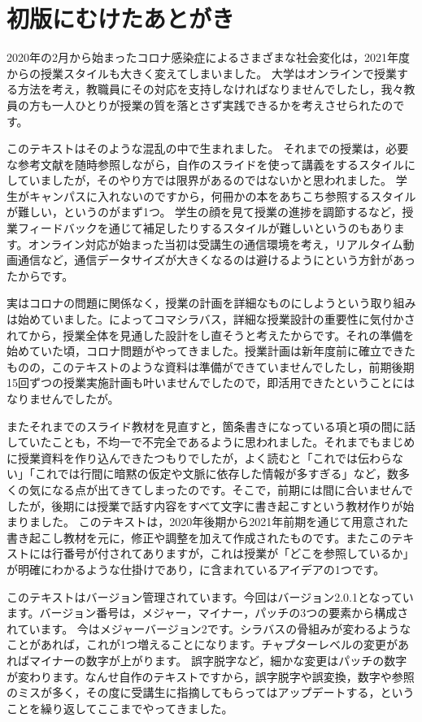 
\section*{初版にむけたあとがき}

2020年の2月から始まったコロナ感染症によるさまざまな社会変化は，2021年度からの授業スタイルも大きく変えてしまいました。
大学はオンラインで授業する方法を考え，教職員にその対応を支持しなければなりませんでしたし，我々教員の方も一人ひとりが授業の質を落とさず実践できるかを考えさせられたのです。

このテキストはそのような混乱の中で生まれました。
それまでの授業は，必要な参考文献を随時参照しながら，自作のスライドを使って講義をするスタイルにしていましたが，そのやり方では限界があるのではないかと思われました。
学生がキャンパスに入れないのですから，何冊かの本をあちこち参照するスタイルが難しい，というのがまず1つ。
学生の顔を見て授業の進捗を調節するなど，授業フィードバックを通じて補足したりするスタイルが難しいというのもあります。オンライン対応が始まった当初は受講生の通信環境を考え，リアルタイム動画通信など，通信データサイズが大きくなるのは避けるようにという方針があったからです。

実はコロナの問題に関係なく，授業の計画を詳細なものにしようという取り組みは始めていました。\textcite{Ashida2019}によってコマシラバス，詳細な授業設計の重要性に気付かされてから，授業全体を見通した設計をし直そうと考えたからです。それの準備を始めていた頃，コロナ問題がやってきました。授業計画は新年度前に確立できたものの，このテキストのような資料は準備ができていませんでしたし，前期後期15回ずつの授業実施計画も叶いませんでしたので，即活用できたということにはなりませんでしたが。

またそれまでのスライド教材を見直すと，箇条書きになっている項と項の間に話していたことも，不均一で不完全であるように思われました。それまでもまじめに授業資料を作り込んできたつもりでしたが，よく読むと「これでは伝わらない」「これでは行間に暗黙の仮定や文脈に依存した情報が多すぎる」など，数多くの気になる点が出てきてしまったのです。そこで，前期には間に合いませんでしたが，後期には授業で話す内容をすべて文字に書き起こすという教材作りが始まりました。
このテキストは，2020年後期から2021年前期を通じて用意された書き起こし教材を元に，修正や調整を加えて作成されたものです。またこのテキストには行番号が付されてありますが，これは授業が「どこを参照しているか」が明確にわかるような仕掛けであり，\textcite{Ashida2019}に含まれているアイデアの1つです。

このテキストはバージョン管理されています。今回はバージョン2.0.1となっています。バージョン番号は，メジャー，マイナー，パッチの3つの要素から構成されています。
今はメジャーバージョン2です。シラバスの骨組みが変わるようなことがあれば，これが1つ増えることになります。チャプターレベルの変更があればマイナーの数字が上がります。
誤字脱字など，細かな変更はパッチの数字が変わります。なんせ自作のテキストですから，誤字脱字や誤変換，数字や参照のミスが多く，その度に受講生に指摘してもらってはアップデートする，ということを繰り返してここまでやってきました。

